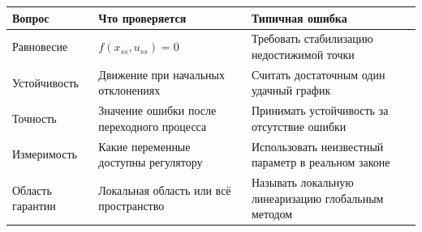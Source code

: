 \begin{center}
\begin{tabularx}{\textwidth}{@{}lYY@{}}
\toprule
Вопрос & Что проверяется & Типичная ошибка\\
\midrule
Равновесие & $f(x_{ss},u_{ss})=0$ & Требовать стабилизацию недостижимой точки\\
Устойчивость & Движение при начальных отклонениях & Считать достаточным один удачный график\\
Точность & Значение ошибки после переходного процесса & Принимать устойчивость за отсутствие ошибки\\
Измеримость & Какие переменные доступны регулятору & Использовать неизвестный параметр в реальном законе\\
Область гарантии & Локальная область или всё пространство & Называть локальную линеаризацию глобальным методом\\
\bottomrule
\end{tabularx}
\end{center}

